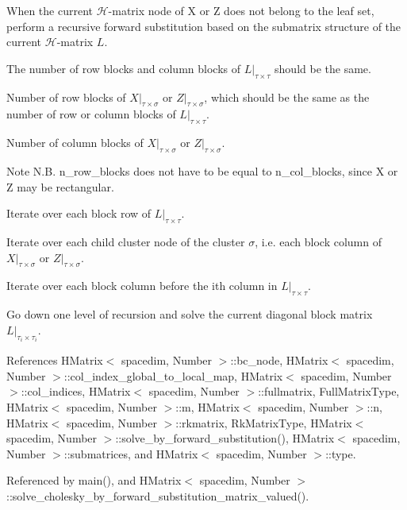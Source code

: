 When the current $\mathcal{H}$-\/matrix node of {\ttfamily X} or {\ttfamily Z} does not belong to the leaf set, perform a recursive forward substitution based on the submatrix structure of the current $\mathcal{H}$-\/matrix $L$.

The number of row blocks and column blocks of $L\vert_{\tau\times\tau}$ should be the same.

Number of row blocks of $X\vert_{\tau\times\sigma}$ or $Z\vert_{\tau\times\sigma}$, which should be the same as the number of row or column blocks of $L\vert_{\tau\times\tau}$.

Number of column blocks of $X\vert_{\tau\times\sigma}$ or $Z\vert_{\tau\times\sigma}$.


\begin{DoxyDescription}
\item[Note ]N.\+B. {\ttfamily n\+\_\+row\+\_\+blocks} does not have to be equal to {\ttfamily n\+\_\+col\+\_\+blocks}, since {\ttfamily X} or {\ttfamily Z} may be rectangular. 
\end{DoxyDescription}

Iterate over each block row of $L\vert_{\tau\times\tau}$.

Iterate over each child cluster node of the cluster $\sigma$, i.\+e. each block column of $X\vert_{\tau\times\sigma}$ or $Z\vert_{\tau\times\sigma}$.

Iterate over each block column before the i\textquotesingle{}th column in $L\vert_{\tau\times\tau}$.

Go down one level of recursion and solve the current diagonal block matrix $L\vert_{\tau_i\times\tau_i}$.

References H\+Matrix$<$ spacedim, Number $>$\+::bc\+\_\+node, H\+Matrix$<$ spacedim, Number $>$\+::col\+\_\+index\+\_\+global\+\_\+to\+\_\+local\+\_\+map, H\+Matrix$<$ spacedim, Number $>$\+::col\+\_\+indices, H\+Matrix$<$ spacedim, Number $>$\+::fullmatrix, Full\+Matrix\+Type, H\+Matrix$<$ spacedim, Number $>$\+::m, H\+Matrix$<$ spacedim, Number $>$\+::n, H\+Matrix$<$ spacedim, Number $>$\+::rkmatrix, Rk\+Matrix\+Type, H\+Matrix$<$ spacedim, Number $>$\+::solve\+\_\+by\+\_\+forward\+\_\+substitution(), H\+Matrix$<$ spacedim, Number $>$\+::submatrices, and H\+Matrix$<$ spacedim, Number $>$\+::type.



Referenced by main(), and H\+Matrix$<$ spacedim, Number $>$\+::solve\+\_\+cholesky\+\_\+by\+\_\+forward\+\_\+substitution\+\_\+matrix\+\_\+valued().

\mbox{\label{classHMatrix_ac5582db8445ec15c69bc4bfdda19d547}} 
